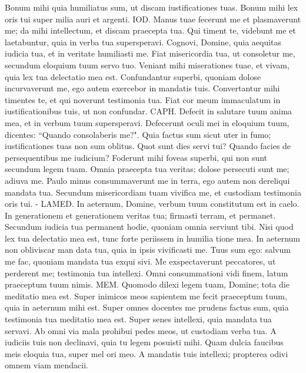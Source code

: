 \begin{biblechapter}
\verse Bonum mihi quia humiliatus sum, ut discam iustificationes tuas. 
\verse Bonum mihi lex oris tui super milia auri et argenti. 
\verse IOD. Manus tuae fecerunt me et plasmaverunt me; da mihi intellectum, et discam praecepta tua. 
\verse Qui timent te, videbunt me et laetabuntur, quia in verba tua supersperavi. 
\verse Cognovi, Domine, quia aequitas iudicia tua, et in veritate humiliasti me. 
\verse Fiat misericordia tua, ut consoletur me, secundum eloquium tuum servo tuo. 
\verse Veniant mihi miserationes tuae, et vivam, quia lex tua delectatio mea est. 
\verse Confundantur superbi, quoniam dolose incurvaverunt me, ego autem exercebor in mandatis tuis. 
\verse Convertantur mihi timentes te, et qui noverunt testimonia tua. 
\verse Fiat cor meum immaculatum in iustificationibus tuis, ut non confundar. 
\verse CAPH. Defecit in salutare tuum anima mea, et in verbum tuum supersperavi. 
\verse Defecerunt oculi mei in eloquium tuum, dicentes: “Quando consolaberis me?". 
\verse Quia factus sum sicut uter in fumo; iustificationes tuas non sum oblitus. 
\verse Quot sunt dies servi tui? Quando facies de persequentibus me iudicium? 
\verse Foderunt mihi foveas superbi, qui non sunt secundum legem tuam. 
\verse Omnia praecepta tua veritas; dolose persecuti sunt me; adiuva me. 
\verse Paulo minus consummaverunt me in terra, ego autem non dereliqui mandata tua. 
\verse Secundum misericordiam tuam vivifica me, et custodiam testimonia oris tui. - 
\verse LAMED. In aeternum, Domine, verbum tuum constitutum est in caelo. 
\verse In generationem et generationem veritas tua; firmasti terram, et permanet. 
\verse Secundum iudicia tua permanent hodie, quoniam omnia serviunt tibi. 
\verse Nisi quod lex tua delectatio mea est, tunc forte periissem in humilia tione mea. 
\verse In aeternum non obliviscar man data tua, quia in ipsis vivificasti me. 
\verse Tuus sum ego: salvum me fac, quoniam mandata tua exqui sivi. 
\verse Me exspectaverunt peccatores, ut perderent me; testimonia tua intellexi. 
\verse Omni consummationi vidi finem, latum praeceptum tuum nimis. 
\verse MEM. Quomodo dilexi legem tuam, Domine; tota die meditatio mea est. 
\verse Super inimicos meos sapientem me fecit praeceptum tuum, quia in aeternum mihi est. 
\verse Super omnes docentes me prudens factus sum, quia testimonia tua meditatio mea est. 
\verse Super senes intellexi, quia mandata tua servavi. 
\verse Ab omni via mala prohibui pedes meos, ut custodiam verba tua. 
\verse A iudiciis tuis non declinavi, quia tu legem posuisti mihi. 
\verse Quam dulcia faucibus meis eloquia tua, super mel ori meo. 
\verse A mandatis tuis intellexi; propterea odivi omnem viam mendacii. 

\end{biblechapter}
